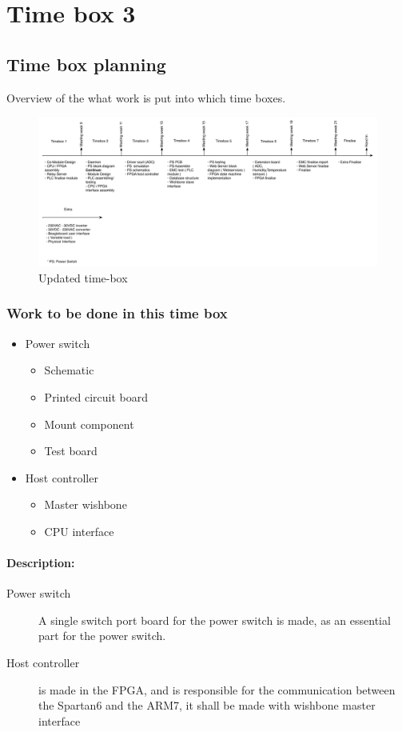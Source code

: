 \section{Time box 3}
\subsection{Time box planning}
Overview of the what work is put into which time boxes.
\begin{figure}[H]
	\begin{centering}
		 \includegraphics[width=1.0\textwidth]{images/tb_r3.pdf}
		\caption{Updated time-box}
	\end{centering}
\end{figure}

\subsubsection{Work to be done in this time box}
\begin{itemize}
	\item Power switch
	\begin{itemize}
		\item Schematic
		\item Printed circuit board
		\item Mount component
		\item Test board
	\end{itemize}
	\item Host controller
	\begin{itemize}
		\item Master wishbone
		\item CPU interface
	\end{itemize}
\end{itemize}
\paragraph{Description:}
\begin{description}
	\item[Power switch] A single switch port board for the power switch is made, as an essential part for the power switch.
	\item[Host controller] is made in the FPGA, and is responsible for the communication between the Spartan6 and the ARM7, it shall be made with wishbone master interface 
\end{description}

